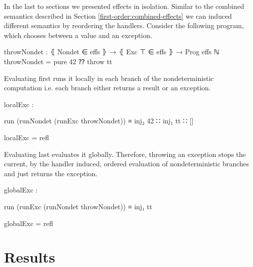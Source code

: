 In the last to sections we presented effects in isolation.
Similar to the combined semantics described in Section
\ref{first-order:combined-effects} we can induced different semantics by
reordering the handlers.
Consider the following program, which chooses between a
 value and an exception.

\begin{code}
throwNondet : ⦃ Nondet ∈ effs ⦄ → ⦃ Exc ⊤ ∈ effs ⦄ → Prog effs ℕ
throwNondet = pure 42 ⁇ throw tt
\end{code}
Evaluating  first runs it locally in each branch of the
nondeterministic computation i.e. each branch either returns a result or an
exception. 
\begin{center}
\begin{code}
localExc : 
\end{code}
\begin{code}[inline]
 run (runNondet (runExc throwNondet)) ≡ inj₂ 42 ∷ inj₁ tt ∷ []
\end{code}
\begin{code}
localExc = refl
\end{code}
\end{center}
Evaluating  last evaluates it globally.
Therefore, throwing an exception stops the current, by the 
handler induced, ordered evaluation of nondeterministic branches and just
returns the exception.
\begin{center}
\begin{code}
globalExc : 
\end{code}
\begin{code}[inline]
 run (runExc (runNondet throwNondet)) ≡ inj₁ tt
\end{code}
\begin{code}
globalExc = refl
\end{code}
\end{center}


\section{Results}

